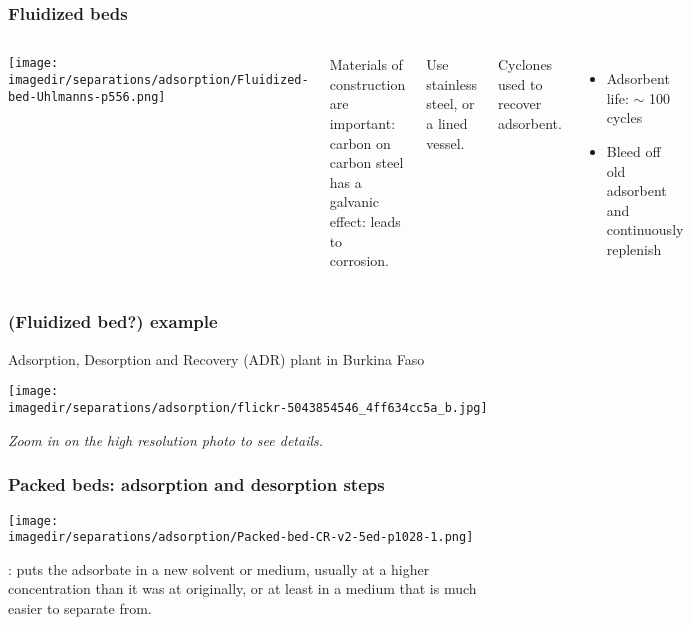 \begin{frame}\frametitle{Fluidized beds}
	\begin{columns}[t]
			\begin{center}
				\texttt{[image: \\imagedir/separations/adsorption/Fluidized-bed-Uhlmanns-p556.png]}
			\end{center}
			\vspace{-18pt}
			Materials of construction are important: carbon on carbon steel has a galvanic effect: leads to corrosion.

			Use stainless steel, or a lined vessel.

			\vspace{12pt}
			Cyclones used to recover adsorbent.

			\begin{itemize}
				\item	Adsorbent life: $\sim$ 100 cycles
				\item	Bleed off old adsorbent and continuously replenish
			\end{itemize}
	\end{columns}
\end{frame}

\begin{frame}\frametitle{(Fluidized bed?) example}
	Adsorption, Desorption and Recovery (ADR) plant in Burkina Faso
	\begin{center}
		\texttt{[image: \\imagedir/separations/adsorption/flickr-5043854546\_4ff634cc5a\_b.jpg]}
	\end{center}
	\vspace{-12pt}
	\emph{Zoom in on the high resolution photo to see details.}
\end{frame}

\begin{frame}\frametitle{Packed beds: adsorption and desorption steps}
	\begin{center}
		\texttt{[image: \\imagedir/separations/adsorption/Packed-bed-CR-v2-5ed-p1028-1.png]}
	\end{center}
	\vspace{-6pt}

	{\color{purple}{Regeneration}}: puts the adsorbate in a new solvent or medium, usually at a higher concentration than it was at originally, or at least in a medium that is much easier to separate from.
\end{frame}

